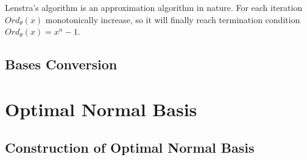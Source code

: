 Lenstra's algorithm is an approximation algorithm in nature. For each iteration $Ord_\theta(x)$ monotonically increase,
so it will finally reach termination condition $Ord_\theta(x) = x^n-1$.
\subsection{Bases Conversion}

\section{Optimal Normal Basis}
\label{append:ONB}
\subsection{Construction of Optimal Normal Basis}
